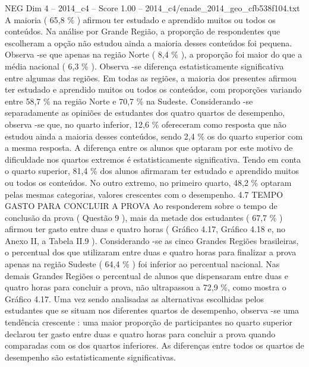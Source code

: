 \begin{textsample}{NEG Dim 4 – 2014\_c4 – Score 1.00 – 2014\_c4/enade\_2014\_geo\_cfb538f104.txt}
A maioria ( 65,8 \% ) afirmou ter estudado e aprendido muitos ou todos os conteúdos.
Na análise por Grande Região, a proporção de respondentes que escolheram a opção não estudou ainda a maioria desses conteúdos foi pequena.
Observa -se que apenas na região Norte ( 8,4 \% ), a proporção foi maior do que a média nacional ( 6,3 \% ).
Observa -se diferença estatisticamente significativa entre algumas das regiões.
Em todas as regiões, a maioria dos presentes afirmou ter estudado e aprendido muitos ou todos os conteúdos, com proporções variando entre 58,7 \% na região Norte e 70,7 \% na Sudeste.
Considerando -se separadamente as opiniões de estudantes dos quatro quartos de desempenho, observa -se que, no quarto inferior, 12,6 \% ofereceram como resposta que não estudou ainda a maioria desses conteúdos, sendo 2,4 \% os do quarto superior com a mesma resposta.
A diferença entre os alunos que optaram por este motivo de dificuldade nos quartos extremos é estatisticamente significativa.
Tendo em conta o quarto superior, 81,4 \% dos alunos afirmaram ter estudado e aprendido muitos ou todos os conteúdos.
No outro extremo, no primeiro quarto, 48,2 \% optaram pelas mesmas categorias, valores crescentes com o desempenho. 4.7 TEMPO GASTO PARA CONCLUIR A PROVA Ao responderem sobre o tempo de conclusão da prova ( Questão 9 ), mais da metade dos estudantes ( 67,7 \% ) afirmou ter gasto entre duas e quatro horas ( Gráfico 4.17, Gráfico 4.18 e, no Anexo II, a Tabela II.9 ).
Considerando -se as cinco Grandes Regiões brasileiras, o percentual dos que utilizaram entre duas e quatro horas para finalizar a prova apenas na região Sudeste ( 64,4 \% ) foi inferior ao percentual nacional.
Nas demais Grandes Regiões o percentual de alunos que dispensaram entre duas e quatro horas para concluir a prova, não ultrapassou a 72,9 \%, como mostra o Gráfico 4.17.
Uma vez sendo analisadas as alternativas escolhidas pelos estudantes que se situam nos diferentes quartos de desempenho, observa -se uma tendência crescente : uma maior proporção de participantes no quarto superior declarou ter gasto entre duas e quatro horas para concluir a prova quando comparadas com os dos quartos inferiores.
As diferenças entre todos os quartos de desempenho são estatisticamente significativas.

\end{textsample}
